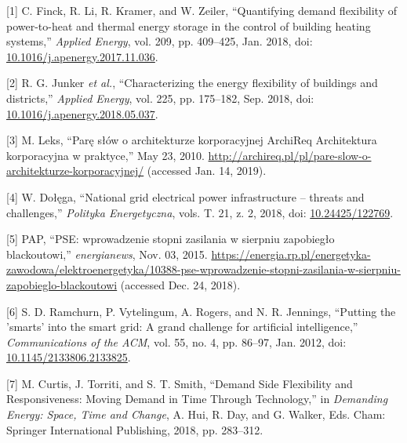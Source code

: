 \hypertarget{refs}{}
\begin{cslreferences}
\leavevmode\hypertarget{ref-finck_quantifying_2018}{}%
{[}1{]} C. Finck, R. Li, R. Kramer, and W. Zeiler, ``Quantifying demand
flexibility of power-to-heat and thermal energy storage in the control
of building heating systems,'' \emph{Applied Energy}, vol. 209, pp.
409--425, Jan. 2018, doi:
\href{https://doi.org/10.1016/j.apenergy.2017.11.036}{10.1016/j.apenergy.2017.11.036}.

\leavevmode\hypertarget{ref-junker_characterizing_2018}{}%
{[}2{]} R. G. Junker \emph{et al.}, ``Characterizing the energy
flexibility of buildings and districts,'' \emph{Applied Energy}, vol.
225, pp. 175--182, Sep. 2018, doi:
\href{https://doi.org/10.1016/j.apenergy.2018.05.037}{10.1016/j.apenergy.2018.05.037}.

\leavevmode\hypertarget{ref-leks_pare_2010}{}%
{[}3{]} M. Leks, ``Parę słów o architekturze korporacyjnej \textbar{}
ArchiReq \textbar{} Architektura korporacyjna w praktyce,'' May 23,
2010.
\url{http://archireq.pl/pl/pare-slow-o-architekturze-korporacyjnej/}
(accessed Jan. 14, 2019).

\leavevmode\hypertarget{ref-dolega_national_2018}{}%
{[}4{]} W. Dołęga, ``National grid electrical power infrastructure --
threats and challenges,'' \emph{Polityka Energetyczna}, vols. T. 21, z.
2, 2018, doi: \href{https://doi.org/10.24425/122769}{10.24425/122769}.

\leavevmode\hypertarget{ref-pap_pse_2015}{}%
{[}5{]} PAP, ``PSE: wprowadzenie stopni zasilania w sierpniu zapobiegło
blackoutowi,'' \emph{energianews}, Nov. 03, 2015.
\url{https://energia.rp.pl/energetyka-zawodowa/elektroenergetyka/10388-pse-wprowadzenie-stopni-zasilania-w-sierpniu-zapobieglo-blackoutowi}
(accessed Dec. 24, 2018).

\leavevmode\hypertarget{ref-ramchurn_putting_2012}{}%
{[}6{]} S. D. Ramchurn, P. Vytelingum, A. Rogers, and N. R. Jennings,
``Putting the 'smarts' into the smart grid: A grand challenge for
artificial intelligence,'' \emph{Communications of the ACM}, vol. 55,
no. 4, pp. 86--97, Jan. 2012, doi:
\href{https://doi.org/10.1145/2133806.2133825}{10.1145/2133806.2133825}.

\leavevmode\hypertarget{ref-curtis_demand_2018}{}%
{[}7{]} M. Curtis, J. Torriti, and S. T. Smith, ``Demand Side
Flexibility and Responsiveness: Moving Demand in Time Through
Technology,'' in \emph{Demanding Energy: Space, Time and Change}, A.
Hui, R. Day, and G. Walker, Eds. Cham: Springer International
Publishing, 2018, pp. 283--312.


\end{cslreferences}
